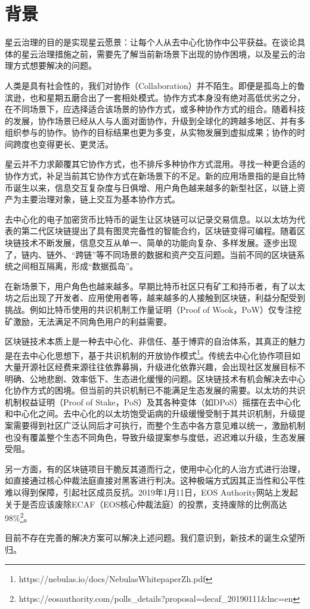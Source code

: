 \section{背景}

星云治理的目的是实现星云愿景：让每个人从去中心化协作中公平获益。在谈论具体的星云治理措施之前，需要先了解当前新场景下出现的协作困境，以及星云的治理方式想要解决的问题。

人类是具有社会性的，我们对协作（Collaboration）并不陌生。即便是孤岛上的鲁滨逊，也和星期五磨合出了一套相处模式。协作方式本身没有绝对高低优劣之分，在不同场景下，应选择适合该场景的协作方式，或多种协作方式的组合。随着科技的发展，协作场景已经从人与人面对面协作，升级到全球化的跨越多地区、并有多组织参与的协作。协作的目标结果也更为多变，从实物发展到虚拟成果；协作的时间跨度也变得更长、更灵活。

星云并不力求颠覆其它协作方式，也不排斥多种协作方式混用。寻找一种更合适的协作方式，补足当前其它协作方式在新场景下的不足。新的应用场景指的是自比特币诞生以来，信息交互复杂度与日俱增、用户角色越来越多的新型社区，以链上资产为主要治理对象，链上交互为基本协作方式。

去中心化的电子加密货币比特币的诞生让区块链可以记录交易信息。以以太坊为代表的第二代区块链提出了具有图灵完备性的智能合约，区块链变得可编程。随着区块链技术不断发展，信息交互从单⼀、简单的功能向复杂、多样发展。逐步出现了，链内、链外、“跨链”等不同场景的数据和资产交互问题。当前不同的区块链系统之间相互隔离，形成“数据孤岛”。

在新场景下，用户角色也越来越多。早期比特币社区只有矿工和持币者，有了以太坊之后出现了开发者、应用使用者等，越来越多的人接触到区块链，利益分配受到挑战。例如比特币使用的共识机制工作量证明（Proof of Wook，PoW）仅专注挖矿激励，无法满足不同角色用户的利益需要。

区块链技术本质上是⼀种去中心化、⾮信任、基于博弈的⾃治体系，其真正的魅力是在去中⼼化思想下，基于共识机制的开放协作模式\footnote{https://nebulas.io/docs/NebulasWhitepaperZh.pdf}。传统去中心化协作项目如大量开源社区经费来源往往依靠募捐，升级进化依靠兴趣，会出现社区发展目标不明确、公地悲剧、效率低下、生态进化缓慢的问题。区块链技术有机会解决去中心化协作方式的困境。但当前的共识机制已不能满足生态发展的需要。以太坊的共识机制权益证明（Proof of Stake，PoS）及其各种变体（如DPoS）摇摆在去中心化和中心化之间。去中心化的以太坊饱受诟病的升级缓慢受制于其共识机制，升级提案需要得到社区广泛认同后才可执行，而整个生态中各方意见难以统一，激励机制也没有覆盖整个生态不同角色，导致升级提案参与度低，迟迟难以升级，生态发展受阻。

另一方面，有的区块链项目干脆反其道而行之，使用中心化的人治方式进行治理，如直接通过核心仲裁法庭直接对黑客进行判决。这种极端方式因其正当性和公平性难以得到保障，引起社区成员反抗。2019年1月11日，EOS Authority网站上发起关于是否应该废除ECAF（EOS核心仲裁法庭）的投票，支持废除的比例高达98\%\footnote{https://eosauthority.com/polls_details?proposal=decaf_20190111\&lnc=en}。

目前不存在完善的解决方案可以解决上述问题。我们意识到，新技术的诞生众望所归。

